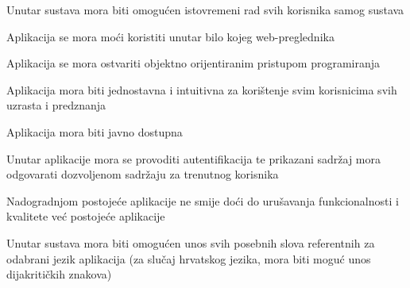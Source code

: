 			  \begin{packed_item}
			 	\item Unutar sustava mora biti omogućen istovremeni rad svih korisnika samog sustava
			 	\item Aplikacija se mora moći koristiti unutar bilo kojeg web-preglednika 
			 	\item Aplikacija se mora ostvariti objektno orijentiranim pristupom programiranja
			 	\item Aplikacija mora biti jednostavna i intuitivna za korištenje svim korisnicima svih uzrasta i predznanja
			 	\item Aplikacija mora biti javno dostupna
			 	\item Unutar aplikacije mora se provoditi autentifikacija te prikazani sadržaj mora odgovarati dozvoljenom sadržaju za trenutnog korisnika
			 	\item Nadogradnjom postojeće aplikacije ne smije doći do urušavanja funkcionalnosti i kvalitete već postojeće aplikacije
			 	\item Unutar sustava mora biti omogućen unos svih posebnih slova referentnih za odabrani jezik aplikacija (za slučaj hrvatskog jezika, mora biti moguć unos dijakritičkih znakova)
			 \end{packed_item}
			 
			 
			 
	